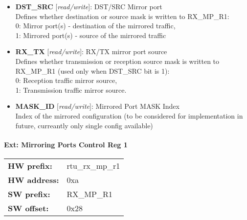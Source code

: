 \begin{itemize}
\item \begin{small}
{\bf 
DST\_SRC
} [\emph{read/write}]: DST/SRC Mirror port
\\
Defines whether destination or source mask is written to RX\_MP\_R1:\\                 0: Mirror port(s) - destination of the mirrored traffic,\\                 1: Mirrored port(s) - source of the mirrored traffic
\end{small}
\item \begin{small}
{\bf 
RX\_TX
} [\emph{read/write}]: RX/TX mirror port source
\\
Defines whether transmission or reception source mask is written to RX\_MP\_R1 (used only when DST\_SRC bit is 1):\\                 0: Reception traffic mirror source,\\                 1: Transmission traffic mirror source.
\end{small}
\item \begin{small}
{\bf 
MASK\_ID
} [\emph{read/write}]: Mirrored Port MASK Index
\\
Index of the mirrored configuration (to be considered for implementation in future, curreantly only single config available)
\end{small}
\end{itemize}
\paragraph*{Ext: Mirroring Ports Control Reg 1}\vspace{12pt}

\begin{tabular}{l l }
{\bf HW prefix:}  & rtu\_rx\_mp\_r1\\
{\bf HW address:}  & 0xa\\
{\bf SW prefix:}  & RX\_MP\_R1\\
{\bf SW offset:}  & 0x28\\
\end{tabular}


